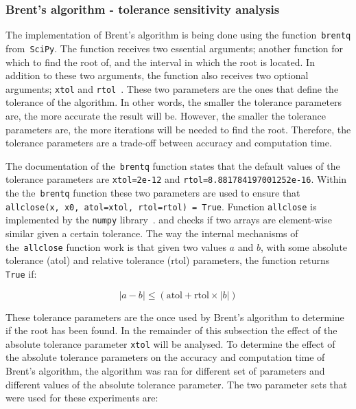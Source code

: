 \subsubsection{Brent's algorithm - tolerance sensitivity analysis}
\label{sec:brent_tolerance}

The implementation of Brent's algorithm is being done using the
function~\lstinline[style=pystyle]{brentq}
from~\lstinline[style=pystyle]{SciPy}.
The function receives two essential arguments; another function for
which to find the root of, and the interval in which the root is located.
In addition to these two arguments, the function also receives two optional
arguments; \lstinline[style=pystyle]{xtol} and
\lstinline[style=pystyle]{rtol}~\cite{2020SciPy-NMeth}.
These two parameters are the ones that define the tolerance of the algorithm.
In other words, the smaller the tolerance parameters are, the more accurate
the result will be.
However, the smaller the tolerance parameters are, the more iterations will
be needed to find the root.
Therefore, the tolerance parameters are a trade-off between accuracy and
computation time.

The documentation of the~\lstinline[style=pystyle]{brentq} function states
that the default values of the tolerance parameters are
\lstinline[style=pystyle]{xtol=2e-12} and
\lstinline[style=pystyle]{rtol=8.881784197001252e-16}.
Within the the~\lstinline[style=pystyle]{brentq} function these two parameters
are used to ensure that
\lstinline[style=pystyle]{allclose(x, x0, atol=xtol, rtol=rtol) = True}.
Function \lstinline[style=pystyle]{allclose} is implemented by the
\lstinline[style=pystyle]{numpy} library~\cite{2020NumPy-Array}.
and checks if two arrays are element-wise similar given a certain tolerance.
The way the internal mechanisms of the~\lstinline[style=pystyle]{allclose}
function work is that given two values \(a\) and \(b\), with some absolute
tolerance (atol) and relative tolerance (rtol) parameters, the function returns
\lstinline[style=pystyle]{True} if:

\begin{equation}
    |a - b| \leq (\text{atol} + \text{rtol} \times |b|)
\end{equation}

These tolerance parameters are the once used by Brent's algorithm to determine
if the root has been found.
In the remainder of this subsection the effect of the absolute tolerance
parameter \lstinline[style=pystyle]{xtol} will be analysed.
To determine the effect of the absolute tolerance parameters on the accuracy and
computation time of Brent's algorithm, the algorithm was ran for different set
of parameters and different values of the absolute tolerance parameter.
The two parameter sets that were used for these experiments are:

